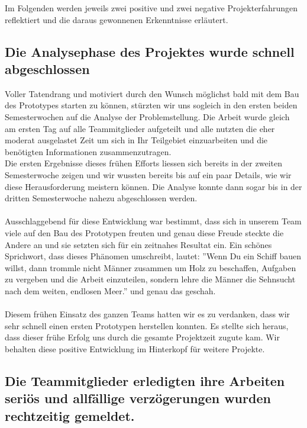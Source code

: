 Im  Folgenden werden jeweils zwei positive und zwei negative Projekterfahrungen reflektiert und die daraus gewonnenen Erkenntnisse erläutert.

\subsection{Die Analysephase des Projektes wurde schnell abgeschlossen}

Voller Tatendrang und motiviert durch den Wunsch möglichst bald mit dem Bau des Prototypes starten zu können, stürzten wir uns sogleich in den ersten beiden Semesterwochen auf die Analyse der Problemstellung. Die Arbeit wurde gleich am ersten Tag auf alle Teammitglieder aufgeteilt und alle nutzten die eher moderat ausgelastet Zeit um sich in Ihr Teilgebiet einzuarbeiten und die benötigten Informationen zusammenzutragen.\\
Die ersten Ergebnisse dieses frühen Efforts liessen sich bereits in der zweiten Semesterwoche zeigen und wir wussten bereits bis auf ein paar Details, wie wir diese Herausforderung meistern können. Die Analyse konnte dann sogar bis in der dritten Semesterwoche nahezu abgeschlossen werden.\\
\\
Ausschlaggebend für diese Entwicklung war bestimmt, dass sich in unserem Team viele auf den Bau des Prototypen freuten und genau diese Freude steckte die Andere an und sie setzten sich für ein zeitnahes Resultat ein. Ein schönes Sprichwort, dass dieses Phänomen umschreibt, lautet:  ''Wenn Du ein Schiff bauen willst, dann trommle nicht Männer zusammen um Holz zu beschaffen, Aufgaben zu vergeben und die Arbeit einzuteilen, sondern lehre die Männer die Sehnsucht nach dem weiten, endlosen Meer.'' \cite{SCHIFF} und genau das geschah.\\
\\
Diesem frühen Einsatz des ganzen Teams hatten wir es zu verdanken, dass wir sehr schnell einen ersten Prototypen herstellen konnten. Es stellte sich heraus, dass dieser frühe Erfolg uns durch die gesamte Projektzeit zugute kam. Wir behalten diese positive Entwicklung im Hinterkopf für weitere Projekte.

\subsection{Die Teammitglieder erledigten ihre Arbeiten seriös und allfällige verzögerungen wurden rechtzeitig gemeldet.}


